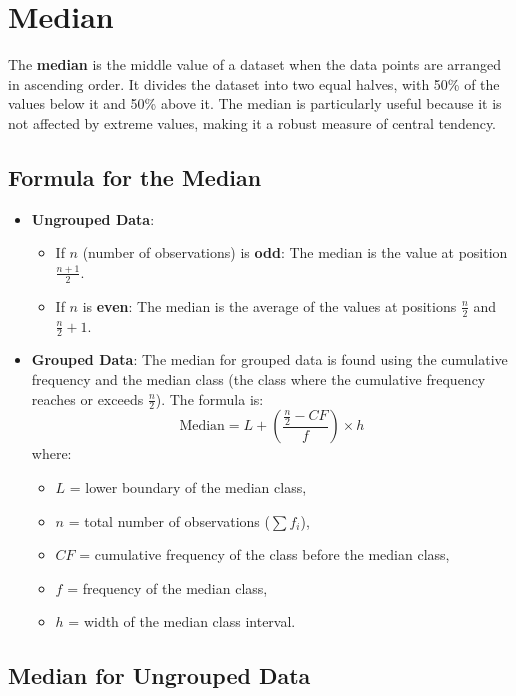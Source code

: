 \documentclass[11pt]{article}
\begin{document}
\section{Median}

The \textbf{median} is the middle value of a dataset when the data points are arranged in ascending order. It divides the dataset into two equal halves, with 50\% of the values below it and 50\% above it. The median is particularly useful because it is not affected by extreme values, making it a robust measure of central tendency.

\subsection*{Formula for the Median}

\begin{itemize}
    \item \textbf{Ungrouped Data}:
    \begin{itemize}
        \item If $n$ (number of observations) is \textbf{odd}: The median is the value at position $\frac{n+1}{2}$.
        \item If $n$ is \textbf{even}: The median is the average of the values at positions $\frac{n}{2}$ and $\frac{n}{2} + 1$.
    \end{itemize}

    \item \textbf{Grouped Data}:
    The median for grouped data is found using the cumulative frequency and the median class (the class where the cumulative frequency reaches or exceeds $\frac{n}{2}$). The formula is:
    \[
    \text{Median} = L + \left( \frac{\frac{n}{2} - CF}{f} \right) \times h
    \]
    where:
    \begin{itemize}
        \item $L$ = lower boundary of the median class,
        \item $n$ = total number of observations ($\sum f_i$),
        \item $CF$ = cumulative frequency of the class before the median class,
        \item $f$ = frequency of the median class,
        \item $h$ = width of the median class interval.
    \end{itemize}
\end{itemize}

\subsection{Median for Ungrouped Data}
\end{document}
